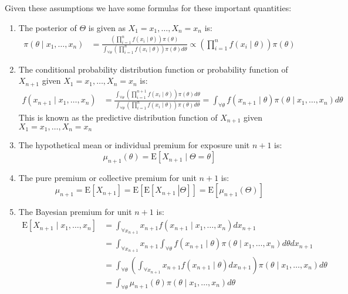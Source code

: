 \documentclass[english,12pt]{article}
\theoremstyle{plain}
\theoremstyle{definition}
\theoremstyle{definition} %
\newcommand{\enuma}[1]{\begin{enumerate}[label=(\alph{*})] #1 \end{enumerate}}
\newcommand{\ex}[1]{\mbox{E} \left[ #1 \right]}
\newcommand{\condex}[2]{\mbox{E} \left[ \left. #1 \ \right\vert \left. #2 \right. \right]}
\begin{document}
Given these assumptions we have some formulas for these important quantities:
\enuma{
\item The posterior of $\Theta$ is given as $X_1=x_1,\ldots,X_n=x_n$ is:
\begin{align*}
\pi(\theta\mid x_1,\ldots,x_n)&=\frac{\left(\prod\limits_{i=1}^nf(x_i\mid\theta)\right)\pi(\theta)}{\int_{\forall\theta}\left(\prod\limits_{i=1}^nf(x_i\mid\theta)\right)\pi(\theta)d\theta}
\propto \left(\prod_{i=1}^nf(x_i\mid\theta)\right)\pi(\theta)
\end{align*}

\item The conditional probability distribution function or probability function of $X_{n+1}$ given $X_1=x_1,\ldots,X_n=x_n$ is:
\begin{align*}
f(x_{n+1}\mid x_1,\ldots,x_n)&=\frac{\int_{\forall\theta}\left(\prod\limits_{i=1}^{n+1}f(x_i\mid\theta)\right)\pi(\theta)d\theta}{\int_{\forall\theta}\left(\prod\limits_{i=1}^nf(x_i\mid\theta)\right)\pi(\theta)d\theta}
=\int_{\forall\theta}f(x_{n+1}\mid\theta)\pi(\theta\mid x_1,\ldots,x_n)d\theta
\end{align*}
This is known as the predictive distribution function of $X_{n+1}$ given $X_1=x_1,\ldots,X_n=x_n$

\item The hypothetical mean or individual premium for exposure unit $n+1$ is:
\[\mu_{n+1}(\theta)=\ex{X_{n+1}\mid\Theta=\theta}\]
\item The pure premium or collective premium for unit $n+1$ is:
\[\mu_{n+1}=\ex{X_{n+1}}=\ex{\condex{X_{n+1}}{\Theta}}=\ex{\mu_{n+1}(\Theta)}\]

\item The Bayesian premium for unit $n+1$ is:
\begin{align*}
\ex{X_{n+1}\mid x_1,\ldots,x_n}
&=\int_{\forall x_{n+1}}x_{n+1}f(x_{n+1}\mid x_1,\ldots,x_n)dx_{n+1}\\
&=\int_{\forall x_{n+1}}x_{n+1}\int_{\forall\theta}f(x_{n+1}\mid\theta)\pi(\theta\mid x_1,\ldots,x_n)d\theta dx_{n+1}\\
&=\int_{\forall\theta}\left(\int_{\forall x_{n+1}}x_{n+1}f(x_{n+1}\mid\theta)dx_{n+1}\right)\pi(\theta\mid x_1,\ldots,x_n)d\theta\\
&=\int_{\forall\theta}\mu_{n+1}(\theta)\pi(\theta\mid x_1,\ldots,x_n)d\theta
\end{align*}
}
\end{document}
